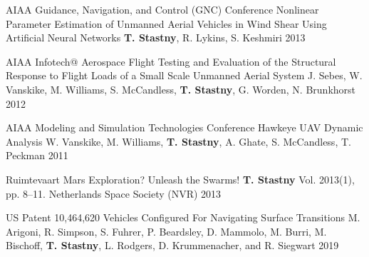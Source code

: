 \begin{cventries}
\begin{cvnumlist}
\item \cvpubentry
	{AIAA Guidance, Navigation, and Control (GNC) Conference} %
	{Nonlinear Parameter Estimation of Unmanned Aerial Vehicles in Wind Shear Using Artificial Neural Networks} %
	{\textbf{T. Stastny}, R. Lykins, S. Keshmiri} %
	{} %
	{2013} %
	{} %
	{} %
		
\item \cvpubentry
	{AIAA Infotech@ Aerospace} %
	{Flight Testing and Evaluation of the Structural Response to Flight Loads of a Small Scale Unmanned Aerial System} %
	{J. Sebes, W. Vanskike, M. Williams, S. McCandless, \textbf{T. Stastny}, G. Worden, N. Brunkhorst} %
	{} %
	{2012} %
	{} %
	{} %

\item \cvpubentry
	{AIAA Modeling and Simulation Technologies Conference} %
	{Hawkeye UAV Dynamic Analysis} %
	{W. Vanskike, M. Williams, \textbf{T. Stastny}, A. Ghate, S. McCandless, T. Peckman} %
	{} %
	{2011} %
	{} %
	{} %
%
\end{cvnumlist}


\begin{flushleft}
\end{flushleft}

\begin{cvnumlist}
%
\item \cvpubentry
	{Ruimtevaart} %
	{Mars Exploration? Unleash the Swarms!} %
	{\textbf{T. Stastny}} %
	{Vol. 2013(1), pp. 8--11. Netherlands Space Society (NVR)} %
	{2013} %
	{} %
	{} %
%
\end{cvnumlist}

\begin{flushleft}
\end{flushleft}

\begin{cvnumlist}
%
\item \cvpubentry
	{US Patent 10,464,620} %
	{Vehicles Configured For Navigating Surface Transitions} %
	{M. Arigoni, R. Simpson, S. Fuhrer, P. Beardsley, D. Mammolo, M. Burri, M. Bischoff, \textbf{T. Stastny}, L. Rodgers, D. Krummenacher, and R. Siegwart} %
	{} %
	{2019} %
	{} %
	{} %
%
\end{cvnumlist}


\end{cventries}

